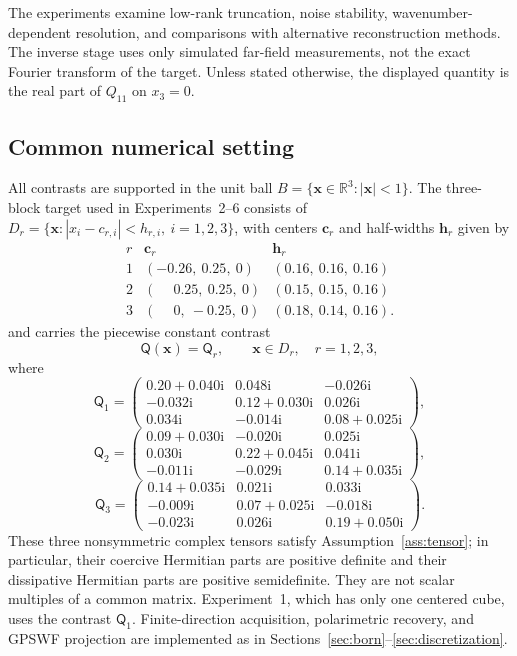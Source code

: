 \documentclass[11pt]{article}
\numberwithin{equation}{section}
\newcommand{\vect}[1]{\bm{#1}}
\newcommand{\tens}[1]{\bm{\mathsf{#1}}}
\newcommand{\Qt}{\ensuremath{\tens{Q}}}
\theoremstyle{plain}
\theoremstyle{definition}
\begin{document}
The experiments examine low-rank truncation, noise stability, wavenumber-
dependent resolution, and comparisons with alternative reconstruction methods.
The inverse stage uses only simulated far-field measurements, not the exact
Fourier transform of the target. Unless stated otherwise, the displayed
quantity is the real part of $Q_{11}$ on $x_3=0$.

\subsection{Common numerical setting}
\label{subsec:maxwell-gpswf-setup}

All contrasts are supported in the unit ball
$B=\{\mathbf{x}\in\mathbb{R}^3:|\mathbf{x}|<1\}$.  The three-block target used
in Experiments~2--6 consists of
$D_r=\{\mathbf x:|x_i-c_{r,i}|<h_{r,i},\ i=1,2,3\}$, with centers
$\mathbf c_r$ and half-widths $\mathbf h_r$ given by
\[
\begin{array}{c|c|c}
 r & \mathbf c_r & \mathbf h_r \\ \hline
 1 & (-0.26,\ 0.25,\ 0) & (0.16,\ 0.16,\ 0.16) \\
 2 & ( \phantom{-}0.25,\ 0.25,\ 0) & (0.15,\ 0.15,\ 0.16) \\
 3 & ( \phantom{-}0,\ -0.25,\ 0) & (0.18,\ 0.14,\ 0.16).
\end{array}
\]
and carries the piecewise constant contrast
\[
  \Qt(\vect{x})=\Qt_r,\qquad \vect{x}\in D_r,\quad r=1,2,3,
\]
where
\[
\Qt_1=\begin{pmatrix}
0.20+0.040\mathrm{i}&0.048\mathrm{i}&-0.026\mathrm{i}\\
-0.032\mathrm{i}&0.12+0.030\mathrm{i}&0.026\mathrm{i}\\
0.034\mathrm{i}&-0.014\mathrm{i}&0.08+0.025\mathrm{i}
\end{pmatrix},
\]
\[
\Qt_2=\begin{pmatrix}
0.09+0.030\mathrm{i}&-0.020\mathrm{i}&0.025\mathrm{i}\\
0.030\mathrm{i}&0.22+0.045\mathrm{i}&0.041\mathrm{i}\\
-0.011\mathrm{i}&-0.029\mathrm{i}&0.14+0.035\mathrm{i}
\end{pmatrix},
\]
\[
\Qt_3=\begin{pmatrix}
0.14+0.035\mathrm{i}&0.021\mathrm{i}&0.033\mathrm{i}\\
-0.009\mathrm{i}&0.07+0.025\mathrm{i}&-0.018\mathrm{i}\\
-0.023\mathrm{i}&0.026\mathrm{i}&0.19+0.050\mathrm{i}
\end{pmatrix}.
\]
These three nonsymmetric complex tensors satisfy
Assumption~\ref{ass:tensor}; in particular, their coercive Hermitian parts are
positive definite and their dissipative Hermitian parts are positive
semidefinite.  They are not scalar multiples of a common matrix. Experiment~1,
which has only one centered cube, uses the contrast $\Qt_1$.
Finite-direction acquisition, polarimetric recovery, and GPSWF projection are
implemented as in Sections~\ref{sec:born}--\ref{sec:discretization}.
\end{document}
